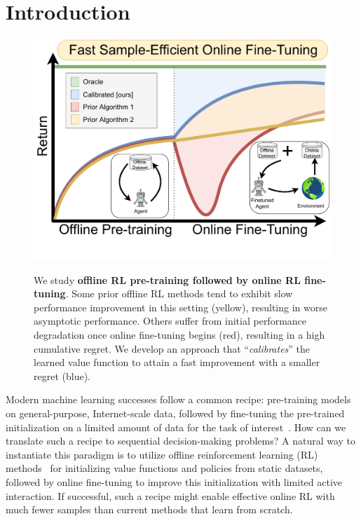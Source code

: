 \section{Introduction}
\label{Introduction}

\begin{figure}
\vspace{-1.6cm}
\begin{center}
{\includegraphics[width=0.85\linewidth]{chapters/cal_ql/figs-sample/Teaser_V2.pdf}}
\vspace{-0.4cm}
\caption{
\footnotesize{We study \textbf{offline RL pre-training followed by online RL fine-tuning}. Some prior offline RL methods tend to exhibit slow performance improvement in this setting (yellow), resulting in worse asymptotic performance. Others suffer from initial performance degradation once online fine-tuning begins (red), resulting in a high cumulative regret. We develop an approach that ``\emph{calibrates}'' the learned value function to attain a fast improvement with a smaller regret (blue).}}
\vspace{-0.7cm}
\label{fig:teaser}
\end{center}
\end{figure}

Modern machine learning successes follow a common recipe: pre-training models on general-purpose, Internet-scale data, followed by fine-tuning the pre-trained initialization on a limited amount of data for the task of interest~\cite{he2022masked,devlin2018bert}. How can we translate such a recipe to sequential decision-making problems? A natural way to instantiate this paradigm is to utilize offline reinforcement learning (RL) methods~\cite{levine2020offline} for initializing value functions and policies from static datasets, followed by online fine-tuning to improve this initialization with limited active interaction. If successful, such a recipe might enable effective online RL with much fewer samples than current methods that learn from scratch.

